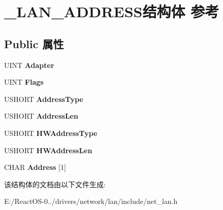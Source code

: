 \hypertarget{struct___l_a_n___a_d_d_r_e_s_s}{}\section{\+\_\+\+L\+A\+N\+\_\+\+A\+D\+D\+R\+E\+S\+S结构体 参考}
\label{struct___l_a_n___a_d_d_r_e_s_s}
\subsection*{Public 属性}
\begin{DoxyCompactItemize}
\item 
\mbox{\label{struct___l_a_n___a_d_d_r_e_s_s_a66ea6c423bdc75dea14a5ac83fca73f6}} 
U\+I\+NT {\bfseries Adapter}
\item 
\mbox{\label{struct___l_a_n___a_d_d_r_e_s_s_a63b105e09978b0ae06ec80f1050d087e}} 
U\+I\+NT {\bfseries Flags}
\item 
\mbox{\label{struct___l_a_n___a_d_d_r_e_s_s_a41679e94a59a81344f2f05661b0792cb}} 
U\+S\+H\+O\+RT {\bfseries Address\+Type}
\item 
\mbox{\label{struct___l_a_n___a_d_d_r_e_s_s_aae1dd52d164824d62212f125dbb9374d}} 
U\+S\+H\+O\+RT {\bfseries Address\+Len}
\item 
\mbox{\label{struct___l_a_n___a_d_d_r_e_s_s_a0328aa287c5b0512cf10e691e948fbbd}} 
U\+S\+H\+O\+RT {\bfseries H\+W\+Address\+Type}
\item 
\mbox{\label{struct___l_a_n___a_d_d_r_e_s_s_ac390e9eb48b7f1f1caf5a2b2e65bed77}} 
U\+S\+H\+O\+RT {\bfseries H\+W\+Address\+Len}
\item 
\mbox{\label{struct___l_a_n___a_d_d_r_e_s_s_ab8440e7c5bfa601163e8c4bf054a1c6f}} 
C\+H\+AR {\bfseries Address} \mbox{[}1\mbox{]}
\end{DoxyCompactItemize}


该结构体的文档由以下文件生成\+:\begin{DoxyCompactItemize}
\item 
E\+:/\+React\+O\+S-\/0../drivers/network/lan/include/net\+\_\+lan.\+h\end{DoxyCompactItemize}
